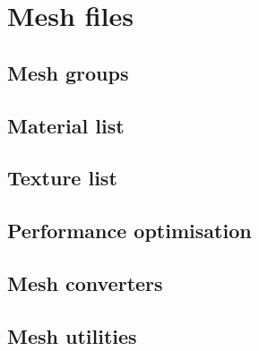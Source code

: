 \documentclass[Orbiter Developer Manual.tex]{subfiles}
\begin{document}
\section{Mesh files}

\subsection{Mesh groups}

\subsection{Material list}

\subsection{Texture list}

\subsection{Performance optimisation}

\subsection{Mesh converters}

\subsection{Mesh utilities}
\end{document}
